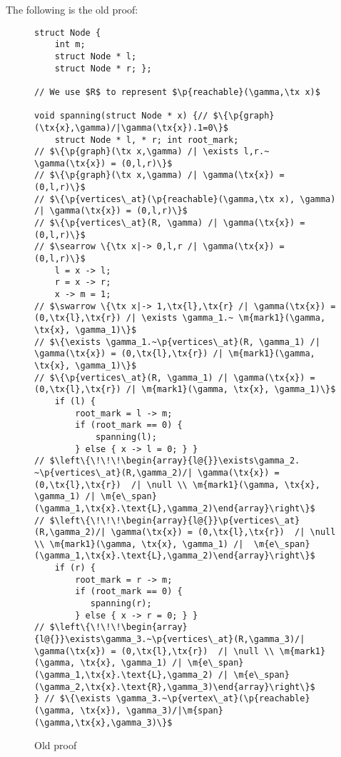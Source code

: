 \documentclass{article}
\newcommand{\tx}[1]{\text{#1}}
\newcommand{\p}[1]{\ensuremath{\mathsf{#1}}} %
\newcommand{\m}[1]{\ensuremath{\mathit{#1}}} %
\begin{document}
The following is the old proof:

\begin{figure}[htbp]
\begin{lstlisting}
struct Node {
    int m;
    struct Node * l;
    struct Node * r; };

// We use $R$ to represent $\p{reachable}(\gamma,\tx x)$

void spanning(struct Node * x) {// $\{\p{graph}(\tx{x},\gamma)/|\gamma(\tx{x}).1=0\}$
    struct Node * l, * r; int root_mark;
// $\{\p{graph}(\tx x,\gamma) /| \exists l,r.~ \gamma(\tx{x}) = (0,l,r)\}$
// $\{\p{graph}(\tx x,\gamma) /| \gamma(\tx{x}) = (0,l,r)\}$
// $\{\p{vertices\_at}(\p{reachable}(\gamma,\tx x), \gamma) /| \gamma(\tx{x}) = (0,l,r)\}$
// $\{\p{vertices\_at}(R, \gamma) /| \gamma(\tx{x}) = (0,l,r)\}$
// $\searrow \{\tx x|-> 0,l,r /| \gamma(\tx{x}) = (0,l,r)\}$
    l = x -> l;
    r = x -> r;
    x -> m = 1;
// $\swarrow \{\tx x|-> 1,\tx{l},\tx{r} /| \gamma(\tx{x}) = (0,\tx{l},\tx{r}) /| \exists \gamma_1.~ \m{mark1}(\gamma, \tx{x}, \gamma_1)\}$
// $\{\exists \gamma_1.~\p{vertices\_at}(R, \gamma_1) /| \gamma(\tx{x}) = (0,\tx{l},\tx{r}) /| \m{mark1}(\gamma, \tx{x}, \gamma_1)\}$
// $\{\p{vertices\_at}(R, \gamma_1) /| \gamma(\tx{x}) = (0,\tx{l},\tx{r}) /| \m{mark1}(\gamma, \tx{x}, \gamma_1)\}$
    if (l) {
        root_mark = l -> m;
        if (root_mark == 0) {
            spanning(l);
        } else { x -> l = 0; } }
// $\left\{\!\!\!\begin{array}{l@{}}\exists\gamma_2. ~\p{vertices\_at}(R,\gamma_2)/| \gamma(\tx{x}) = (0,\tx{l},\tx{r})  /| \null \\ \m{mark1}(\gamma, \tx{x}, \gamma_1) /| \m{e\_span}(\gamma_1,\tx{x}.\text{L},\gamma_2)\end{array}\right\}$
// $\left\{\!\!\!\begin{array}{l@{}}\p{vertices\_at}(R,\gamma_2)/| \gamma(\tx{x}) = (0,\tx{l},\tx{r})  /| \null \\ \m{mark1}(\gamma, \tx{x}, \gamma_1) /|  \m{e\_span}(\gamma_1,\tx{x}.\text{L},\gamma_2)\end{array}\right\}$
    if (r) {
        root_mark = r -> m;
        if (root_mark == 0) {
           spanning(r);
        } else { x -> r = 0; } }
// $\left\{\!\!\!\begin{array}{l@{}}\exists\gamma_3.~\p{vertices\_at}(R,\gamma_3)/| \gamma(\tx{x}) = (0,\tx{l},\tx{r})  /| \null \\ \m{mark1}(\gamma, \tx{x}, \gamma_1) /| \m{e\_span}(\gamma_1,\tx{x}.\text{L},\gamma_2) /| \m{e\_span}(\gamma_2,\tx{x}.\text{R},\gamma_3)\end{array}\right\}$
} // $\{\exists \gamma_3.~\p{vertex\_at}(\p{reachable}(\gamma, \tx{x}), \gamma_3)/|\m{span}(\gamma,\tx{x},\gamma_3)\}$
\end{lstlisting}
\caption{Old proof}
\end{figure}
\end{document}

